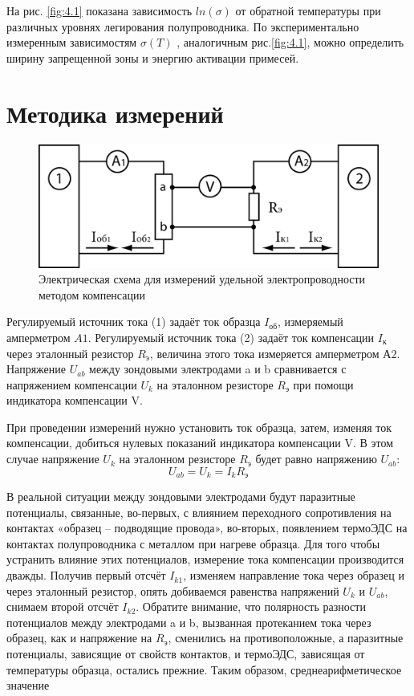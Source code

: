  На рис. \ref{fig:4.1} показана зависимость $ln(\sigma)$ от обратной температуры при различных уровнях легирования полупроводника. По
 экспериментально измеренным зависимостям $\sigma(T)$ , аналогичным рис.\ref{fig:4.1}, можно определить ширину запрещенной зоны и
 энергию активации примесей. 

\section{Методика измерений}

\begin{figure}[h!]
	\centering
	\includegraphics[width = .9\linewidth]{img/scheme.jpg}
	\caption{Электрическая схема для измерений удельной электропроводности методом компенсации}
	\label{fig:5.1}
\end{figure}

Регулируемый источник тока (1) задаёт ток образца $I_\text{об}$, измеряемый амперметром $A1$. Регулируемый источник тока
(2) задаёт ток компенсации $I_\text{к}$ через эталонный резистор $R_\text{э}$, величина этого тока измеряется
амперметром $А2$. Напряжение $U_{ab}$ между зондовыми электродами a и b сравнивается с напряжением компенсации $U_k$ на
эталонном резисторе $R_\text{э}$ при помощи индикатора компенсации V.

При проведении измерений нужно установить ток образца, затем, изменяя ток компенсации, добиться нулевых показаний
индикатора компенсации V. В этом случае напряжение $U_k$ на эталонном резисторе $R_\text{э}$ будет равно напряжению $U_{ab}$:
\begin{equation}
	U_{ab}=U_{k}=I_{k} R_{\text{э}} 
	\label{eq:5.1}
\end{equation}

В реальной ситуации между зондовыми электродами будут паразитные потенциалы, связанные, во-первых, с влиянием
переходного сопротивления на контактах «образец – подводящие провода», во-вторых, появлением термоЭДС на контактах
полупроводника с металлом при нагреве образца. Для того чтобы устранить влияние этих потенциалов, измерение тока
компенсации производится дважды. Получив первый отсчёт $I_{k1}$, изменяем направление тока через образец и через
эталонный резистор, опять добиваемся равенства напряжений $U_k$ и $U_{ab}$, снимаем второй отсчёт $I_{k2}$. Обратите
внимание, что полярность разности потенциалов между электродами a и b, вызванная протеканием тока через образец, как и
напряжение на $R_\text{э}$, сменились на противоположные, а паразитные потенциалы, зависящие от свойств контактов, и
термоЭДС, зависящая от температуры образца, остались прежние. Таким образом, среднеарифметическое значение 

